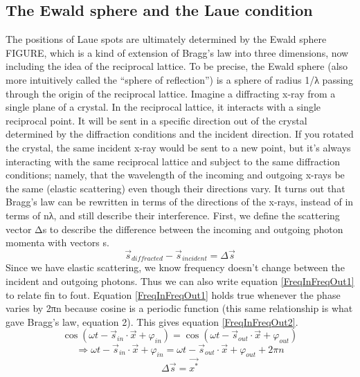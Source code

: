 \subsection{The Ewald sphere and the Laue condition}
The positions of Laue spots are ultimately determined by the Ewald sphere FIGURE, which is a kind of extension of Bragg’s law into three dimensions, now including the idea of the reciprocal lattice. To be precise, the Ewald sphere (also more intuitively called the “sphere of reflection”) is a sphere of radius 1/λ passing through the origin of the reciprocal lattice. 
Imagine a diffracting x-ray from a single plane of a crystal. In the reciprocal lattice, it interacts with a single reciprocal point. It will be sent in a specific direction out of the crystal determined by the diffraction conditions and the incident direction. If you rotated the crystal, the same incident x-ray would be sent to a new point, but it’s always interacting with the same reciprocal lattice and subject to the same diffraction conditions; namely, that the wavelength of the incoming and outgoing x-rays be the same (elastic scattering) even though their directions vary.
It turns out that Bragg’s law can be rewritten in terms of the directions of the x-rays, instead of in terms of nλ, and still describe their interference. First, we define the scattering vector Δs to describe the difference between the incoming and outgoing photon momenta with vectors s.
\begin{equation}
    \vec{s}_{diffracted}-\vec{s}_{incident}=\Delta\vec{s}
    \label{ScattVec}
\end{equation}
 Since we have elastic scattering, we know frequency doesn’t change between the incident and outgoing photons. Thus we can also write equation \ref{FreqInFreqOut1} to relate fin to fout. Equation \ref{FreqInFreqOut1} holds true whenever the phase varies by 2πn because cosine is a periodic function (this same relationship is what gave Bragg’s law, equation 2). This gives equation \ref{FreqInFreqOut2}. 
\begin{equation}
   \cos{(\omega t-\vec{s}_{in}\cdot\vec{x}+\varphi_{in})}=\cos{(\omega t-\vec{s}_{out}\cdot\vec{x}+\varphi_{out})}
    \label{FreqInFreqOut1}
\end{equation}
\begin{equation}
    \Rightarrow\omega t-\vec{s}_{in}\cdot\vec{x}+\varphi_{in}=\omega t-\vec{s}_{out}\cdot\vec{x}+\varphi_{out}+2\pi n
    \label{FreqInFreqOut2}
\end{equation}
\begin{equation}
    \Delta\vec{s}=\vec{x^*}
    \label{FreqInFreqOut3}
\end{equation}
